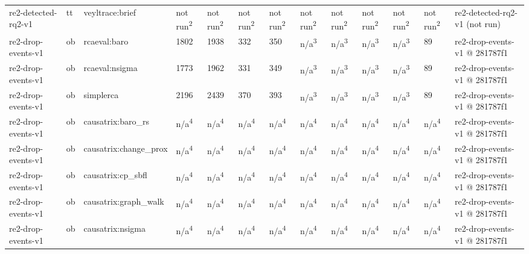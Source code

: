 \begin{table}[t]
\begin{tabular}{lllllllllllll}
re2-detected-rq2-v1 & tt & veyltrace:brief & not run\textsuperscript{2} & not run\textsuperscript{2} & not run\textsuperscript{2} & not run\textsuperscript{2} & not run\textsuperscript{2} & not run\textsuperscript{2} & not run\textsuperscript{2} & not run\textsuperscript{2} & not run\textsuperscript{2} & re2-detected-rq2-v1 (not run) \\
re2-drop-events-v1 & ob & rcaeval:baro & 1802 & 1938 & 332 & 350 & n/a\textsuperscript{3} & n/a\textsuperscript{3} & n/a\textsuperscript{3} & n/a\textsuperscript{3} & 89 & re2-drop-events-v1 @ 281787f1 \\
re2-drop-events-v1 & ob & rcaeval:nsigma & 1773 & 1962 & 331 & 349 & n/a\textsuperscript{3} & n/a\textsuperscript{3} & n/a\textsuperscript{3} & n/a\textsuperscript{3} & 89 & re2-drop-events-v1 @ 281787f1 \\
re2-drop-events-v1 & ob & simplerca & 2196 & 2439 & 370 & 393 & n/a\textsuperscript{3} & n/a\textsuperscript{3} & n/a\textsuperscript{3} & n/a\textsuperscript{3} & 89 & re2-drop-events-v1 @ 281787f1 \\
re2-drop-events-v1 & ob & causatrix:baro\_rs & n/a\textsuperscript{4} & n/a\textsuperscript{4} & n/a\textsuperscript{4} & n/a\textsuperscript{4} & n/a\textsuperscript{4} & n/a\textsuperscript{4} & n/a\textsuperscript{4} & n/a\textsuperscript{4} & n/a\textsuperscript{4} & re2-drop-events-v1 @ 281787f1 \\
re2-drop-events-v1 & ob & causatrix:change\_prox & n/a\textsuperscript{4} & n/a\textsuperscript{4} & n/a\textsuperscript{4} & n/a\textsuperscript{4} & n/a\textsuperscript{4} & n/a\textsuperscript{4} & n/a\textsuperscript{4} & n/a\textsuperscript{4} & n/a\textsuperscript{4} & re2-drop-events-v1 @ 281787f1 \\
re2-drop-events-v1 & ob & causatrix:cp\_sbfl & n/a\textsuperscript{4} & n/a\textsuperscript{4} & n/a\textsuperscript{4} & n/a\textsuperscript{4} & n/a\textsuperscript{4} & n/a\textsuperscript{4} & n/a\textsuperscript{4} & n/a\textsuperscript{4} & n/a\textsuperscript{4} & re2-drop-events-v1 @ 281787f1 \\
re2-drop-events-v1 & ob & causatrix:graph\_walk & n/a\textsuperscript{4} & n/a\textsuperscript{4} & n/a\textsuperscript{4} & n/a\textsuperscript{4} & n/a\textsuperscript{4} & n/a\textsuperscript{4} & n/a\textsuperscript{4} & n/a\textsuperscript{4} & n/a\textsuperscript{4} & re2-drop-events-v1 @ 281787f1 \\
re2-drop-events-v1 & ob & causatrix:nsigma & n/a\textsuperscript{4} & n/a\textsuperscript{4} & n/a\textsuperscript{4} & n/a\textsuperscript{4} & n/a\textsuperscript{4} & n/a\textsuperscript{4} & n/a\textsuperscript{4} & n/a\textsuperscript{4} & n/a\textsuperscript{4} & re2-drop-events-v1 @ 281787f1 \\

\end{tabular}
\end{table}
